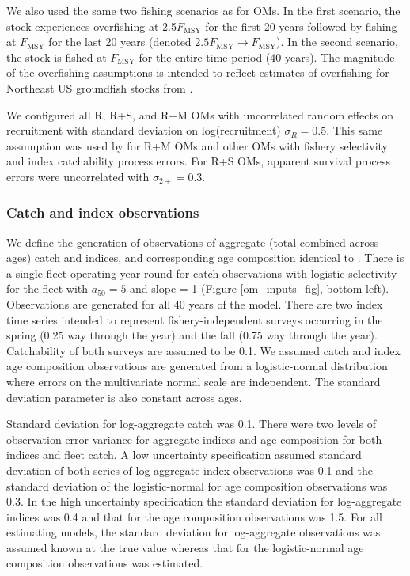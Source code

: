 \documentclass[
  12pt,
]{article}
\newcommand{\Fmsy}{\ensuremath{F_{\text{MSY}}}\xspace}
\begin{document}
We also used the same two fishing scenarios as \citet{milleretal_inreview1} for OMs. In the first scenario, the stock experiences overfishing at 2.5\Fmsy for the first 20 years followed by fishing at \Fmsy for the last 20 years (denoted \(2.5\Fmsy \rightarrow \Fmsy\)). In the second scenario, the stock is fished at \Fmsy for the entire time period (40 years). The magnitude of the overfishing assumptions is intended to reflect estimates of overfishing for Northeast US groundfish stocks from \citet{wiedenmannetal19}.

We configured all R, R+S, and R+M OMs with uncorrelated random effects on recruitment with standard deviation on log(recruitment) \(\sigma_R = 0.5\). This same assumption was used by \citet{milleretal_inreview1} for R+M OMs and other OMs with fishery selectivity and index catchability process errors. For R+S OMs, apparent survival process errors were uncorrelated with \(\sigma_{2+} = 0.3\).

\hypertarget{catch-and-index-observations}{%
\subsubsection*{Catch and index observations}\label{catch-and-index-observations}}

We define the generation of observations of aggregate (total combined across ages) catch and indices, and corresponding age composition identical to \citet{milleretal_inreview1}. There is a single fleet operating year round for catch observations with logistic selectivity for the fleet with \(a_{50} = 5\) and slope = 1 (Figure \ref{om_inputs_fig}, bottom left). Observations are generated for all 40 years of the model. There are two index time series intended to represent fishery-independent surveys occurring in the spring (0.25 way through the year) and the fall (0.75 way through the year). Catchability of both surveys are assumed to be 0.1. We assumed catch and index age composition observations are generated from a logistic-normal distribution where errors on the multivariate normal scale are independent. The standard deviation parameter is also constant across ages.

Standard deviation for log-aggregate catch was 0.1. There were two levels of observation error variance for aggregate indices and age composition for both indices and fleet catch. A low uncertainty specification assumed standard deviation of both series of log-aggregate index observations was 0.1 and the standard deviation of the logistic-normal for age composition observations was 0.3. In the high uncertainty specification the standard deviation for log-aggregate indices was 0.4 and that for the age composition observations was 1.5. For all estimating models, the standard deviation for log-aggregate observations was assumed known at the true value whereas that for the logistic-normal age composition observations was estimated.
\end{document}
